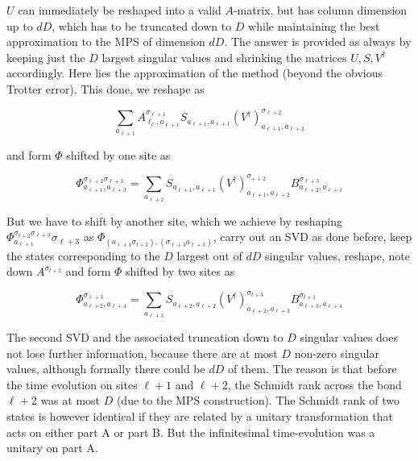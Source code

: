 \documentclass[12pt]{article}
\begin{document}
$U$ can immediately be reshaped into a valid $A$-matrix, but has column dimension up to $d D$, which has to be truncated down to $D$ while maintaining the best approximation to the MPS of dimension $d D$. The answer is provided as always by keeping just the $D$ largest singular values and shrinking the matrices $U, S, V^{\dagger}$ accordingly. Here lies the approximation of the method (beyond the obvious Trotter error). This done, we reshape as


\begin{equation*}
\sum_{a_{\ell+1}} A_{\ell_{\ell}, a_{\ell+1}}^{\sigma_{\ell+1}} S_{a_{\ell+1}, a_{\ell+1}}\left(V^{\dagger}\right)_{a_{\ell+1}, a_{\ell+2}}^{\sigma_{\ell+2}} \tag{259}
\end{equation*}


and form $\Phi$ shifted by one site as


\begin{equation*}
\Phi_{a_{\ell+1}, a_{\ell+3}}^{\sigma_{\ell+2} \sigma_{\ell+3}}=\sum_{a_{\ell+2}} S_{a_{\ell+1}, a_{\ell+1}}\left(V^{\dagger}\right)_{a_{\ell+1}, a_{\ell+2}}^{\sigma_{++2}} B_{a_{\ell+2}, a_{\ell+3}}^{\sigma_{\ell+3}} \tag{260}
\end{equation*}


But we have to shift by another site, which we achieve by reshaping $\Phi_{a_{\ell+1}}^{\sigma_{t+2} \sigma_{\ell+3}} \sigma_{\ell+3}$ as $\Phi_{\left(a_{\ell+1} \sigma_{t+2}\right),\left(\sigma_{\ell+3} a_{\ell+3}\right)}$, carry out an SVD as done before, keep the states corresponding to the $D$ largest out of $d D$ singular values, reshape, note down $A^{\sigma_{t+2}}$ and form $\Phi$ shifted by two sites as


\begin{equation*}
\Phi_{a_{\ell+2}, a_{\ell+4}}^{\sigma_{\ell+3}}=\sum_{a_{\ell+3}} S_{a_{\ell+2}, a_{\ell+2}}\left(V^{\dagger}\right)_{a_{\ell+2}, a_{\ell+3}}^{\sigma_{t+3}} B_{a_{\ell+3}, a_{\ell+4}}^{\sigma_{t+1}} \tag{261}
\end{equation*}


The second SVD and the associated truncation down to $D$ singular values does not lose further information, because there are at most $D$ non-zero singular values, although formally there could be $d D$ of them. The reason is that before the time evolution on sites $\ell+1$ and $\ell+2$, the Schmidt rank across the bond $\ell+2$ was at most $D$ (due to the MPS construction). The Schmidt rank of two states is however identical if they are related by a unitary transformation that acts on either part A or part B. But the infinitesimal time-evolution was a unitary on part A.
\end{document}
